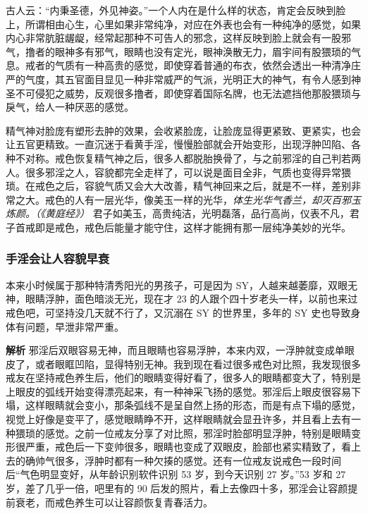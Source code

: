 古人云：“内秉圣德，外见神姿。”一个人内在是什么样的状态，肯定会反映到脸上，所谓相由心生，心里如果非常纯净，对应在外表也会有一种纯净的感觉，如果内心非常肮脏龌龊，经常起那种不可告人的邪念，这样反映到脸上就会有一股邪气，撸者的眼神多有邪气，眼睛也没有定光，眼神涣散无力，眉宇间有股猥琐的气息。戒者的气质有一种高贵的感觉，即使穿着普通的布衣，依然会透出一种清净庄严的气度，其五官面目显见一种非常威严的气派，光明正大的神气，有令人感到神圣不可侵犯之威势，反观很多撸者，即使穿着国际名牌，也无法遮挡他那股猥琐与戾气，给人一种厌恶的感觉。

精气神对脸庞有塑形去肿的效果，会收紧脸庞，让脸庞显得更紧致、更紧实，也会让五官更精致。一直沉迷于看黄手淫，慢慢脸部就会开始变形，出现浮肿凹陷、各种不对称。戒色恢复精气神之后，很多人都脱胎换骨了，与之前邪淫的自己判若两人。很多邪淫之人，容貌都完全走样了，可以说是面目全非，气质也变得异常猥琐。在戒色之后，容貌气质又会大大改善，精气神回来之后，就是不一样，差别非常之大。戒色的人有一层光华，像美玉一样的光华，\textit{体生光华气香兰，却灭百邪玉炼颜。（《黄庭经》）} 君子如美玉，高贵纯洁，光明磊落，品行高尚，仪表不凡，君子首戒即是戒色，戒色后能量才能守住，这样才能拥有那一层纯净美妙的光华。

\subsubsection{手淫会让人容貌早衰}

\begin{case}
    本来小时候属于那种特清秀阳光的男孩子，可是因为 SY，人越来越萎靡，双眼无神，眼睛浮肿，面色暗淡无光，现在才 23 的人跟个四十岁老头一样，以前也来过戒色吧，可坚持没几天就不行了，又沉溺在 SY 的世界里，多年的 SY 史也导致身体有问题，早泄非常严重。

    \textbf{解析} 邪淫后双眼容易无神，而且眼睛也容易浮肿，本来内双，一浮肿就变成单眼皮了，或者眼眶凹陷，显得特别无神。我到现在看过很多戒色对比照，我发现很多戒友在坚持戒色养生后，他们的眼睛变得好看了，很多人的眼睛都变大了，特别是上眼皮的弧线开始变得漂亮起来，有一种神采飞扬的感觉。邪淫后上眼皮很容易下塌，这样眼睛就会变小，那条弧线不是呈自然上扬的形态，而是有点下塌的感觉，视觉上好像是变平了，感觉眼睛睁不开，这样眼睛就会显丑许多，并且看上去有一种猥琐的感觉。之前一位戒友分享了对比照，邪淫时脸部明显浮肿，特别是眼睛变形很严重，戒色后一下变帅很多，眼睛也变成了双眼皮，脸部也紧实精致了，看上去的确帅气很多，浮肿时都有一种欠揍的感觉。还有一位戒友说戒色一段时间后“气色明显变好，从年龄识别软件识别 53 岁，到今天识别 27 岁。”53 岁和 27 岁，差了几乎一倍，吧里有的 90 后发的照片，看上去像四十多，邪淫会让容颜提前衰老，而戒色养生可以让容颜恢复青春活力。
\end{case}

